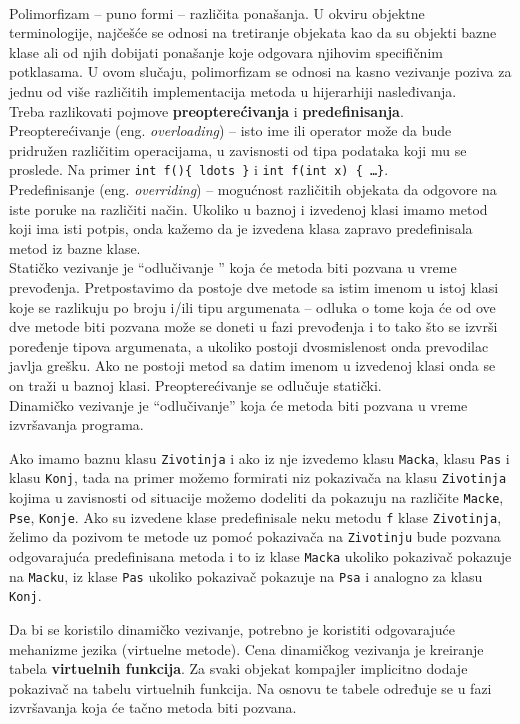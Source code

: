 \documentclass[../main.tex]{subfiles}
\begin{document}
\\
Polimorfizam -- puno formi -- različita ponašanja. U okviru objektne terminologije, najčešće se odnosi na tretiranje objekata kao da su objekti bazne klase ali od njih dobijati ponašanje koje odgovara njihovim specifičnim potklasama. U ovom slučaju, polimorfizam se odnosi na kasno vezivanje poziva za jednu od više različitih implementacija metoda u hijerarhiji nasleđivanja.
\\
Treba razlikovati pojmove {\bf preopterećivanja} i {\bf predefinisanja}. 
\\
Preopterećivanje (eng. {\it overloading}) -- isto ime ili operator može da bude pridružen različitim operacijama, u zavisnosti od tipa podataka koji mu se proslede. Na primer \texttt{int f()\{\ ldots \}} i \texttt{int f(int x) \{ \ldots \}}. 
\\
Predefinisanje (eng. {\it overriding}) -- mogućnost različitih objekata da odgovore na iste poruke na različiti način. Ukoliko u baznoj i izvedenoj klasi imamo metod koji ima isti potpis, onda kažemo da je izvedena klasa zapravo predefinisala metod iz bazne klase.
\\
Statičko vezivanje je ``odlučivanje '' koja će metoda biti pozvana u vreme prevođenja. Pretpostavimo da postoje dve metode sa istim imenom u istoj klasi koje se razlikuju po broju i/ili tipu argumenata -- odluka o tome koja će od ove dve metode biti pozvana može se doneti u fazi prevođenja i to tako što se izvrši poređenje tipova argumenata, a ukoliko postoji dvosmislenost onda prevodilac javlja grešku. Ako ne postoji metod sa datim imenom u izvedenoj klasi onda se on traži u baznoj klasi. Preopterećivanje se odlučuje statički.
\\
Dinamičko vezivanje je ``odlučivanje'' koja će metoda biti pozvana u vreme izvršavanja programa.
\begin{boxprimer}
Ako imamo baznu klasu \texttt{Zivotinja} i ako iz nje izvedemo klasu \texttt{Macka}, klasu \texttt{Pas} i klasu \texttt{Konj}, tada na primer možemo formirati niz pokazivača na klasu \texttt{Zivotinja} kojima u zavisnosti od situacije možemo dodeliti da pokazuju na različite \texttt{Macke}, \texttt{Pse}, \texttt{Konje}. Ako su izvedene klase predefinisale neku metodu \texttt{f} klase \texttt{Zivotinja}, želimo da pozivom te metode uz pomoć pokazivača na \texttt{Zivotinju} bude pozvana odgovarajuća predefinisana metoda i to iz klase \texttt{Macka} ukoliko pokazivač pokazuje na \texttt{Macku}, iz klase \texttt{Pas} ukoliko pokazivač pokazuje na \texttt{Psa} i analogno za klasu \texttt{Konj}.
\end{boxprimer}
Da bi se koristilo dinamičko vezivanje, potrebno je koristiti odgovarajuće mehanizme jezika (virtuelne metode). Cena dinamičkog vezivanja je kreiranje tabela {\bf virtuelnih funkcija}. Za svaki objekat kompajler implicitno dodaje pokazivač na tabelu virtuelnih funkcija. Na osnovu te tabele određuje se u fazi izvršavanja koja će tačno metoda biti pozvana. 
\end{document}
